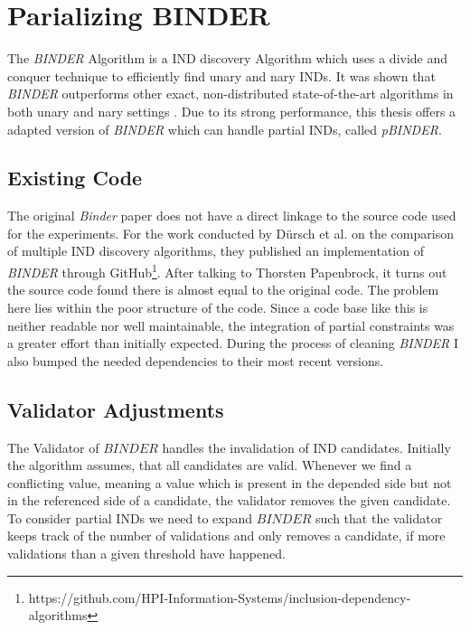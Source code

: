\section{Parializing BINDER}
The \textit{BINDER} Algorithm \cite{papenbrock2015divide} is a IND discovery Algorithm which uses a divide and conquer technique to efficiently find unary and nary INDs. It was shown that \textit{BINDER} outperforms other exact, non-distributed state-of-the-art algorithms in both unary and nary settings \cite{dursch2019inclusion}. Due to its strong performance, this thesis offers a adapted version of \textit{BINDER} which can handle partial INDs, called \textit{pBINDER}.

\subsection{Existing Code}
The original \textit{Binder} paper does not have a direct linkage to the source code used for the experiments. For the work conducted by Dürsch et al. on the comparison of multiple IND discovery algorithms\cite{dursch2019inclusion}, they published an implementation of \textit{BINDER} through GitHub\footnote{https://github.com/HPI-Information-Systems/inclusion-dependency-algorithms}. After talking to Thorsten Papenbrock, it turns out the source code found there is almost equal to the original code. The problem here lies within the poor structure of the code. Since a code base like this is neither readable nor well maintainable, the integration of partial constraints was a greater effort than initially expected. During the process of cleaning \textit{BINDER} I also bumped the needed dependencies to their most recent versions.

\subsection{Validator Adjustments}
The Validator of $BINDER$ handles the invalidation of IND candidates. Initially the algorithm assumes, that all candidates are valid. Whenever we find a conflicting value, meaning a value which is present in the depended side but not in the referenced side of a candidate, the validator removes the given candidate. To consider partial INDs we need to expand $BINDER$ such that the validator keeps track of the number of validations and only removes a candidate, if more validations than a given threshold have happened.



